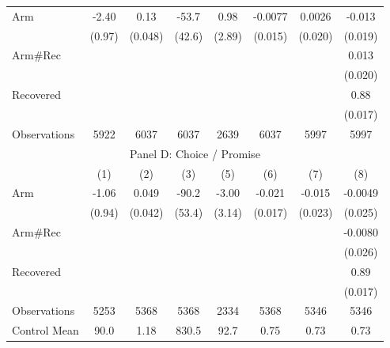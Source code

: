\begin{tabular}{lccccccc}
\midrule
\midrule
Arm   & -2.40 & 0.13  & -53.7 & 0.98  & -0.0077 & 0.0026 & -0.013 \\
      & (0.97) & (0.048) & (42.6) & (2.89) & (0.015) & (0.020) & (0.019) \\
Arm\#Rec &       &       &       &       &       &       & 0.013 \\
      &       &       &       &       &       &       & (0.020) \\
Recovered &       &       &       &       &       &       & 0.88 \\
      &       &       &       &       &       &       & (0.017) \\
\midrule
Observations & 5922  & 6037  & 6037  & 2639  & 6037  & 5997  & 5997 \\
\midrule
\multicolumn{8}{c}{Panel D: Choice / Promise} \\
\midrule
\midrule
      & (1)   & (2)   & (3)   & (5)   & (6)   & (7)   & (8) \\
\midrule
\midrule
Arm   & -1.06 & 0.049 & -90.2 & -3.00 & -0.021 & -0.015 & -0.0049 \\
      & (0.94) & (0.042) & (53.4) & (3.14) & (0.017) & (0.023) & (0.025) \\
Arm\#Rec &       &       &       &       &       &       & -0.0080 \\
      &       &       &       &       &       &       & (0.026) \\
Recovered &       &       &       &       &       &       & 0.89 \\
      &       &       &       &       &       &       & (0.017) \\
\midrule
Observations & 5253  & 5368  & 5368  & 2334  & 5368  & 5346  & 5346 \\
\midrule
\midrule
Control Mean & 90.0  & 1.18  & 830.5 & 92.7  & 0.75  & 0.73  & 0.73 \\
\bottomrule
\bottomrule
\end{tabular}%
